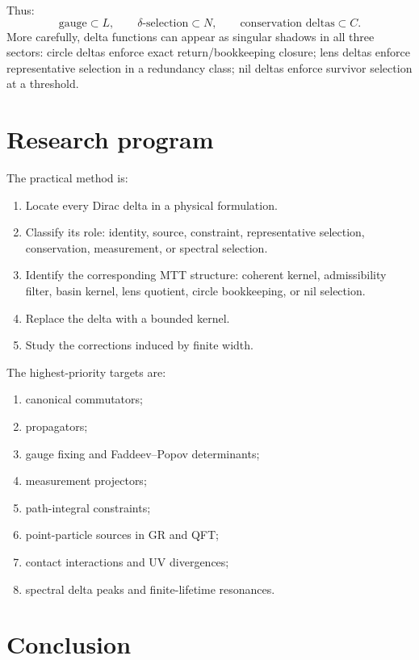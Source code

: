 \documentclass[11pt]{article}
\begin{document}
Thus:
\begin{equation}
\text{gauge}\subset L,\qquad
\delta\text{-selection}\subset N,\qquad
\text{conservation deltas}\subset C.
\end{equation}
More carefully, delta functions can appear as singular shadows in all three sectors:
circle deltas enforce exact return/bookkeeping closure; lens deltas enforce representative
selection in a redundancy class; nil deltas enforce survivor selection at a threshold.

\section{Research program}

The practical method is:
\begin{enumerate}
\item Locate every Dirac delta in a physical formulation.
\item Classify its role: identity, source, constraint, representative selection, conservation,
measurement, or spectral selection.
\item Identify the corresponding MTT structure: coherent kernel, admissibility filter, basin
kernel, lens quotient, circle bookkeeping, or nil selection.
\item Replace the delta with a bounded kernel.
\item Study the corrections induced by finite width.
\end{enumerate}

The highest-priority targets are:
\begin{enumerate}
\item canonical commutators;
\item propagators;
\item gauge fixing and Faddeev--Popov determinants;
\item measurement projectors;
\item path-integral constraints;
\item point-particle sources in GR and QFT;
\item contact interactions and UV divergences;
\item spectral delta peaks and finite-lifetime resonances.
\end{enumerate}

\section{Conclusion}
\end{document}
